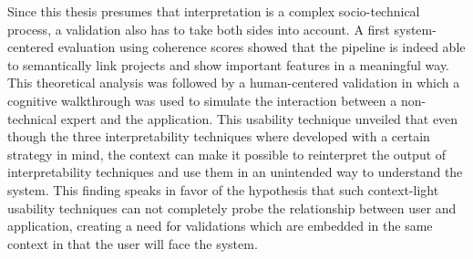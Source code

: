 Since this thesis presumes that interpretation is a complex socio-technical process, a validation also has to take both sides into account. A first system-centered evaluation using coherence scores showed that the pipeline is indeed able to semantically link projects and show important features in a meaningful way. This theoretical analysis was followed by a human-centered validation in which a cognitive walkthrough was used to simulate the interaction between a non-technical expert and the application. This usability technique unveiled that even though the three interpretability techniques where developed with a certain strategy in mind, the context can make it possible to reinterpret the output of interpretability techniques and use them in an unintended way to understand the system. This finding speaks in favor of the hypothesis that such context-light usability techniques can not completely probe the relationship between user and application, creating a need for validations which are embedded in the same context in that the user will face the system.





\cleardoublepage
